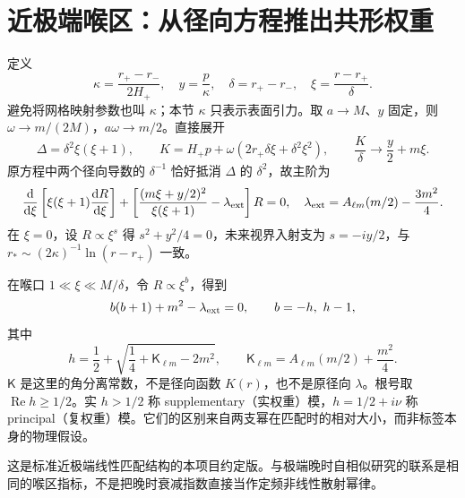 \documentclass[UTF8,fontset=fandol,11pt,a4paper,oneside]{ctexart}
\numberwithin{equation}{section}
\newcommand{\dd}{\mathrm d}
\newcommand{\Ree}{\operatorname{Re}}
\begin{document}
\section{近极端喉区：从径向方程推出共形权重}
\label{sec:new-throat}
定义
\begin{equation}
 \kappa=\frac{r_+-r_-}{2H_+},\quad y=\frac p\kappa,\quad
 \delta=r_+-r_-,\quad \xi=\frac{r-r_+}{\delta}.
\end{equation}
避免将网格映射参数也叫 $\kappa$；本节 $\kappa$ 只表示表面引力。取 $a\to M$、$y$ 固定，则 $\omega\to m/(2M)$，$a\omega\to m/2$。直接展开
\begin{equation}
 \Delta=\delta^2\xi(\xi+1),\qquad
 K=H_+p+\omega(2r_+\delta\xi+\delta^2\xi^2),\qquad
 \frac K\delta\to\frac y2+m\xi.
\end{equation}
原方程中两个径向导数的 $\delta^{-1}$ 恰好抵消 $\Delta$ 的 $\delta^2$，故主阶为
\begin{equation}
 \frac{\dd}{\dd\xi}\left[\xi(\xi+1)\frac{\dd R}{\dd\xi}\right]
 +\left[\frac{(m\xi+y/2)^2}{\xi(\xi+1)}-\lambda_{\rm ext}\right]R=0,
 \quad\lambda_{\rm ext}=A_{\ell m}(m/2)-\frac{3m^2}{4}.
\label{eq:new-near-ode}
\end{equation}
在 $\xi=0$，设 $R\propto\xi^s$ 得 $s^2+y^2/4=0$，未来视界入射支为 $s=-iy/2$，与 $r_*\sim(2\kappa)^{-1}\ln(r-r_+)$ 一致。

在喉口 $1\ll\xi\ll M/\delta$，令 $R\propto\xi^b$，得到
\begin{equation}
 b(b+1)+m^2-\lambda_{\rm ext}=0,
 \qquad b=-h,\ h-1,
\end{equation}
其中
\begin{equation}
 \boxed{h=\frac12+\sqrt{\frac14+\mathsf K_{\ell m}-2m^2},\qquad
 \mathsf K_{\ell m}=A_{\ell m}(m/2)+\frac{m^2}{4}.}
\end{equation}
$\mathsf K$ 是这里的角分离常数，不是径向函数 $K(r)$，也不是原径向 $\lambda$。根号取 $\Ree h\ge1/2$。实 $h>1/2$ 称 supplementary（实权重）模，$h=1/2+i\nu$ 称 principal（复权重）模。它们的区别来自两支幂在匹配时的相对大小，而非标签本身的物理假设。

这是标准近极端线性匹配结构的本项目约定版\cite{BredbergKerrCFT2010}。与极端晚时自相似研究的联系是相同的喉区指标，不是把晚时衰减指数直接当作定频非线性散射幂律。
\end{document}
